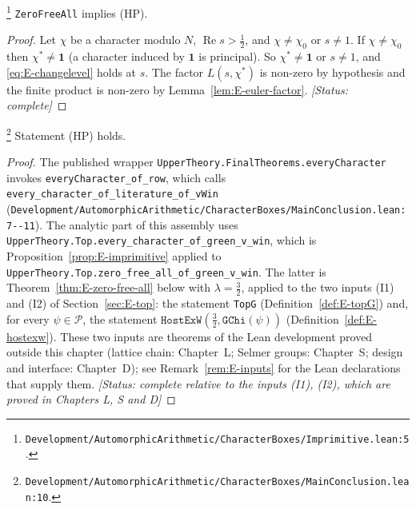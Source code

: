 \begin{proposition}\label{prop:E-imprimitive}
\footnote{\nolinkurl{Development/AutomorphicArithmetic/CharacterBoxes/Imprimitive.lean:5}.}%
\texttt{ZeroFreeAll} implies \textup{(HP)}.
\end{proposition}
\begin{proof}
Let $\chi$ be a character modulo $N$, $\operatorname{Re}s>\tfrac12$, and $\chi\neq\chi_0$ or
$s\neq1$. If $\chi\neq\chi_0$ then $\chi^{*}\neq\mathbf 1$ (a character induced by $\mathbf 1$ is
principal). So $\chi^{*}\neq\mathbf1$ or $s\neq1$, and \eqref{eq:E-changelevel} holds at $s$. The
factor $L(s,\chi^{*})$ is non-zero by hypothesis and the finite product is non-zero by
Lemma~\ref{lem:E-euler-factor}.
\textit{[Status: complete]}
\end{proof}

\begin{theorem}\label{thm:E-every-character}
\footnote{\nolinkurl{Development/AutomorphicArithmetic/CharacterBoxes/MainConclusion.lean:10}.}%
Statement \textup{(HP)} holds.
\end{theorem}
\begin{proof}
The published wrapper \texttt{UpperTheory.FinalTheorems.everyCharacter} invokes
\texttt{everyCharacter\_of\_row}, which calls
\texttt{every\_character\_of\_literature\_of\_vWin}
(\nolinkurl{Development/AutomorphicArithmetic/CharacterBoxes/MainConclusion.lean:7--11}).
The analytic part of this assembly uses
\texttt{UpperTheory.Top.every\_character\_of\_green\_v\_win}, which is
Proposition~\ref{prop:E-imprimitive} applied to
\texttt{UpperTheory.Top.zero\_free\_all\_of\_green\_v\_win}. The latter is
Theorem~\ref{thm:E-zero-free-all} below with $\lambda=\tfrac32$, applied to the two inputs
\textup{(I1)} and \textup{(I2)} of Section~\ref{sec:E-top}: the statement \texttt{TopG}
(Definition~\ref{def:E-topG}) and, for every $\psi\in\mathcal P$, the statement
$\texttt{HostExW}(\tfrac32,\texttt{GChi}(\psi))$ (Definition~\ref{def:E-hostexw}). These two inputs
are theorems of the Lean development proved outside this chapter (lattice chain: Chapter~L; Selmer
groups: Chapter~S; design and interface: Chapter~D); see Remark~\ref{rem:E-inputs} for the Lean
declarations that supply them.
\textit{[Status: complete relative to the inputs \textup{(I1)}, \textup{(I2)}, which are proved in
Chapters L, S and D]}
\end{proof}

